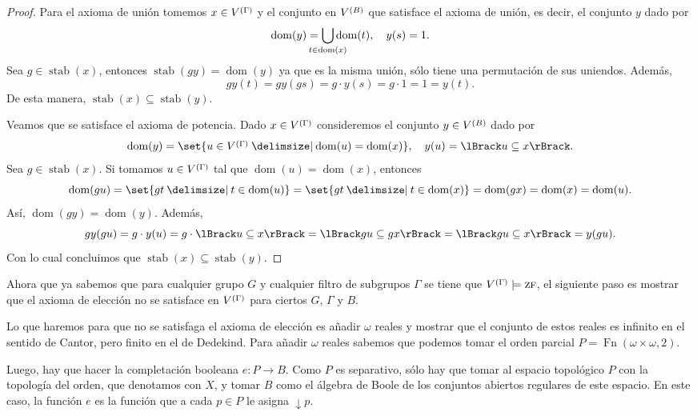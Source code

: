 \documentclass[letterpaper,DIV=15,12pt]{scrartcl}
\DeclarePairedDelimiter{\vb}{\lBrack}{\rBrack}             %
\DeclareMathOperator{\dom}{dom}                            %
\DeclareMathOperator{\stab}{stab}                          %
\DeclareMathOperator{\fn}{Fn}                              %
\DeclareMathOperator{\abajo}{\downarrow}                   %
\newcommand{\st}{}
\newcommand{\SetSymbol}[1][]{%
\nonscript\:#1\vert
\allowbreak
\nonscript\:
\mathopen{}}
\renewcommand\st{\SetSymbol[\delimsize]}
\begin{document}
\begin{proof}
    Para el axioma de unión tomemos \(x\in\mg\) y el conjunto en \(\mb\) que
    satisface el axioma de unión, es decir, el conjunto \(y\) dado por
    \begin{equation*}
        \dom(y)=\bigcup_{\mathclap{t\in\dom(x)}}\dom(t), \quad y(s)=1.
    \end{equation*}
    Sea \(g\in\stab(x)\), entonces \(\stab(gy)=\dom(y)\) ya que es la misma
    unión, sólo tiene una permutación de sus uniendos. Además,
    \begin{equation*}
        gy(t)=gy(gs)=g\cdot y(s)=g\cdot 1=1=y(t).
    \end{equation*}
    De esta manera, \(\stab(x)\subseteq\stab(y)\).

    Veamos que se satisface el axioma de potencia. Dado \(x\in\mg\) consideremos
    el conjunto \(y\in\mb\) dado por
    \begin{equation*}
        \dom(y)=\set{u\in\mg\st \dom(u)=\dom(x)}, \quad y(u)=\vb{u\subseteq x}.
    \end{equation*}
    Sea \(g\in\stab(x)\). Si tomamos \(u\in\mg\) tal que \(\dom(u)=\dom(x)\),
    entonces
    \begin{equation*}
        \dom(gu)=\set{gt\st t\in\dom(u)}=\set{gt\st t\in\dom(x)}
        =\dom(gx)=\dom(x)=\dom(u).
    \end{equation*}
    Así, \(\dom(gy)=\dom(y)\). Además,
    \begin{equation*}
        gy(gu)=g\cdot y(u)=g\cdot\vb{u\subseteq x}=\vb{gu\subseteq gx}=\vb{gu\subseteq x}=y(gu).
    \end{equation*}
    Con lo cual concluimos que \(\stab(x)\subseteq\stab(y)\).
\end{proof}

Ahora que ya sabemos que para cualquier grupo \(G\) y cualquier filtro de
subgrupos \(\Gamma\) se tiene que \(\mg\models\text{\textsc{zf}}\), el siguiente
paso es mostrar que el axioma de elección no se satisface en \(\mg\) para
ciertos \(G\), \(\Gamma\) y \(B\).

Lo que haremos para que no se satisfaga el axioma de elección es añadir
\(\omega\) reales y mostrar que el conjunto de estos reales es infinito en el
sentido de Cantor, pero finito en el de Dedekind. Para añadir \(\omega\) reales
sabemos que podemos tomar el orden parcial \(P=\fn(\omega\times\omega,2)\).

Luego, hay que hacer la completación booleana \(e\colon P\to B\). Como \(P\) es
separativo, sólo hay que tomar al espacio topológico \(P\) con la topología del
orden, que denotamos con \(X\), y tomar \(B\) como el álgebra de Boole de los
conjuntos abiertos regulares de este espacio. En este caso, la función \(e\) es
la función que a cada \(p\in P\) le asigna \(\abajo p\).
\end{document}
